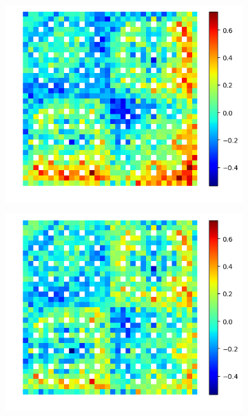 \begin{figure}[H]
  \centering 
\begin{subfigure}{0.45\textwidth}
  \centering
  \includegraphics[width=\linewidth]{figures/reflector/fiss-null-errors}
  \caption{}
  \label{fig:reflector-fiss-null-error}
\end{subfigure}
\begin{subfigure}{0.45\textwidth}
  \centering
  \includegraphics[width=\linewidth]{figures/reflector/fiss-degenerate-errors}
  \caption{}
  \label{fig:reflector-fiss-degen-error}
\end{subfigure}

\end{figure}
